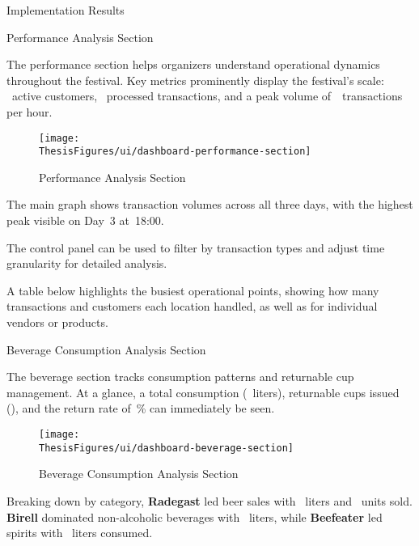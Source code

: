 \begin{section}{Implementation Results}
	\begin{subsection}{Performance Analysis Section}
		\label{subsec:implementation-results-structure-performance}

		The performance section helps organizers understand operational dynamics throughout the festival.
		Key metrics prominently display the festival's scale: ~active customers, ~processed transactions, and a peak volume of~~transactions per hour.

		\begin{figure}[H]
			\centering
			\texttt{[image: \\ThesisFigures/ui/dashboard-performance-section]}
			\caption{Performance Analysis Section}
			\label{fig:dashboard-performance-analysis}
		\end{figure}

		The main graph shows transaction volumes across all three days, with the highest peak visible on Day~3 at~18:00.

		The control panel can be used to filter by transaction types and adjust time granularity for detailed analysis.

		A table below highlights the busiest operational points, showing how many transactions and customers each location handled, as well as for individual vendors or products.
	\end{subsection}

	\begin{subsection}{Beverage Consumption Analysis Section}
		\label{subsec:implementation-results-structure-beverage}

		The beverage section tracks consumption patterns and returnable cup management.
		At a glance, a total consumption (~liters), returnable cups issued (), and the return rate of~\% can immediately be seen.

		\begin{figure}[H]
			\centering
			\texttt{[image: \\ThesisFigures/ui/dashboard-beverage-section]}
			\caption{Beverage Consumption Analysis Section}
			\label{fig:dashboard-beverage-analysis}
		\end{figure}

		Breaking down by category, \textbf{Radegast} led beer sales with ~liters and ~units sold.
		\textbf{Birell} dominated non-alcoholic beverages with ~liters, while \textbf{Beefeater} led spirits with ~liters consumed.
	\end{subsection}


\end{section}
